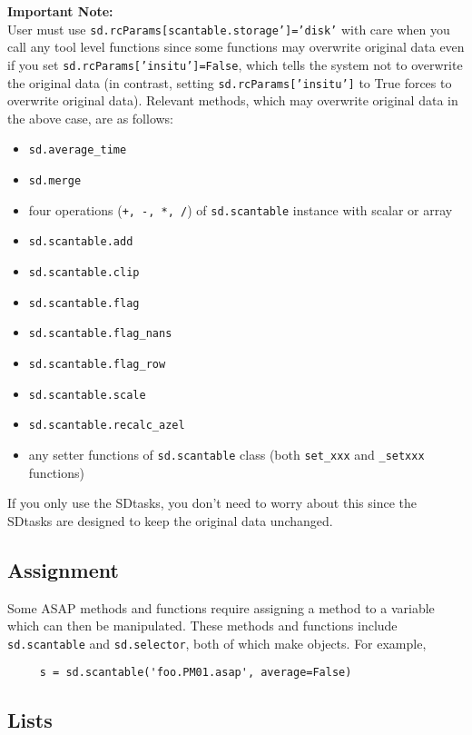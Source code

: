 {\bf Important Note:}\\
User must use {\tt sd.rcParams[scantable.storage']='disk'} with care when 
you call any tool level functions since some functions may overwrite original data 
even if you set {\tt sd.rcParams['insitu']=False}, which tells the system not to 
overwrite the original data (in contrast, setting {\tt sd.rcParams['insitu']} to True 
forces to overwrite original data). 
Relevant methods, which may overwrite original data in the above case, are as follows:
\small
\begin{itemize}
   \item {\tt sd.average\_time}
   \item {\tt sd.merge}
   \item four operations ({\tt +, -, *, /}) of {\tt sd.scantable} instance with scalar or array
   \item {\tt sd.scantable.add}
   \item {\tt sd.scantable.clip}
   \item {\tt sd.scantable.flag}
   \item {\tt sd.scantable.flag\_nans}
   \item {\tt sd.scantable.flag\_row}
   \item {\tt sd.scantable.scale}
   \item {\tt sd.scantable.recalc\_azel}
   \item any setter functions of {\tt sd.scantable} class (both {\tt set\_xxx} and {\tt \_setxxx} functions)
\end{itemize}
\normalsize
If you only use the SDtasks, you don't need to worry about this since the 
SDtasks are designed to keep the original data unchanged.  

\subsection{Assignment}
\label{section:sd.intro.ass}

Some ASAP methods and functions require assigning a method
to a variable which can then be manipulated.  These methods and functions include
{\tt sd.scantable} and {\tt sd.selector}, both of which make objects.
For example,
\small
\begin{verbatim}
     s = sd.scantable('foo.PM01.asap', average=False) 
\end{verbatim}
\normalsize

\subsection{Lists}
\label{section:sd.intro.lists}

